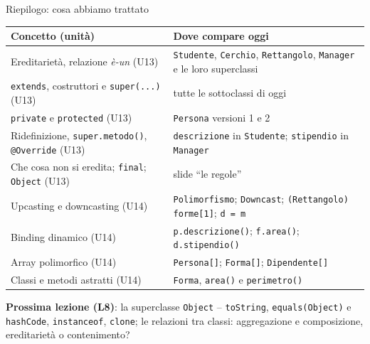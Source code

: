 \documentclass[10pt,aspectratio=169]{beamer}
\begin{document}
\begin{frame}{Riepilogo: cosa abbiamo trattato}
\footnotesize
\begin{center}
\renewcommand{\arraystretch}{1.25}
\begin{tabular}{|l|l|}
\hline
\textbf{Concetto (unità)} & \textbf{Dove compare oggi} \\
\hline
Ereditarietà, relazione \emph{è-un} (U13) & \texttt{Studente}, \texttt{Cerchio}, \texttt{Rettangolo}, \texttt{Manager} e le loro superclassi \\
\hline
\texttt{extends}, costruttori e \texttt{super(...)} (U13) & tutte le sottoclassi di oggi \\
\hline
\texttt{private} e \texttt{protected} (U13) & \texttt{Persona} versioni 1 e 2 \\
\hline
Ridefinizione, \texttt{super.metodo()}, \texttt{@Override} (U13) & \texttt{descrizione} in \texttt{Studente}; \texttt{stipendio} in \texttt{Manager} \\
\hline
Che cosa non si eredita; \texttt{final}; \texttt{Object} (U13) & slide ``le regole'' \\
\hline
Upcasting e downcasting (U14) & \texttt{Polimorfismo}; \texttt{Downcast}; \texttt{(Rettangolo) forme[1]}; \texttt{d = m} \\
\hline
Binding dinamico (U14) & \texttt{p.descrizione()}; \texttt{f.area()}; \texttt{d.stipendio()} \\
\hline
Array polimorfico (U14) & \texttt{Persona[]}; \texttt{Forma[]}; \texttt{Dipendente[]} \\
\hline
Classi e metodi astratti (U14) & \texttt{Forma}, \texttt{area()} e \texttt{perimetro()} \\
\hline
\end{tabular}
\end{center}

\vspace{0.1cm}
\textbf{Prossima lezione (L8)}: la superclasse \texttt{Object} -- \texttt{toString}, \texttt{equals(Object)} e \texttt{hashCode}, \texttt{instanceof}, \texttt{clone}; le relazioni tra classi: aggregazione e composizione, ereditarietà o contenimento?
\end{frame}
\end{document}
